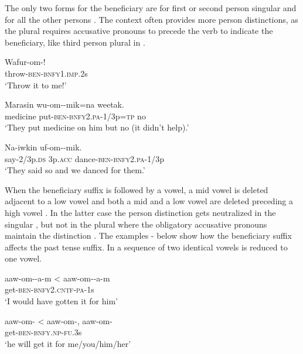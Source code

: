 The only two forms for the beneficiary are \textstyleEmphasizedVernacularWords{\nobreakdash-} for first or second person singular  and \textstyleEmphasizedVernacularWords{\nobreakdash-} for all the other persons . The context often provides more person distinctions, as the plural requires accusative pronouns to precede the verb to indicate the beneficiary, like third person plural in . 

\ea%
\label{ex:3:x225}
\gll Wafur-om-! \\
throw-\textsc{ben}-\textsc{bnfy}1.\textsc{imp}.2s \\
\glt`Throw it to me!' 
\z

\ea%
\label{ex:3:x226}
\gll Marasin wu-om--mik=na weetak. \\
medicine put-\textsc{ben}-\textsc{bnfy}2.\textsc{pa}-1/3p=\textsc{tp} no \\
\glt`They put medicine on him but no (it didn't help).'
\z

\ea%
\label{ex:3:x227}
\gll Na-iwkin  uf-om--mik. \\
say-2/3p.\textsc{ds} 3p.\textsc{acc} dance-\textsc{ben}-\textsc{bnfy}2.\textsc{pa}-1/3p \\
\glt`They said so and we danced for them.'
\z

When the beneficiary suffix is followed by a vowel, a mid vowel is deleted adjacent to a low vowel  and both a mid and a low vowel are deleted preceding a high vowel . In the latter case the person distinction gets neutralized in the singular , but not in the plural where the obligatory accusative pronouns maintain the distinction . The examples - below show how the beneficiary suffix affects the past tense suffix. In  a sequence of two identical vowels is reduced to one vowel.

\ea%
\label{ex:3:x228}
\gll aaw-om--a-m {{\textless} aaw-om}--a-m \\
get-\textsc{ben}-\textsc{bnfy}2.\textsc{cntf}-\textsc{pa}-1s \\
\glt`I would have gotten it for him' 
\z

\ea%
\label{ex:3:x444}
\gll aaw-om- {{\textless} aaw-om-}, aaw-om- \\
get-\textsc{ben}-\textsc{bnfy}.\textsc{np}-\textsc{fu}.3s\\
\glt`he will get it for me/you/him/her'
\z

